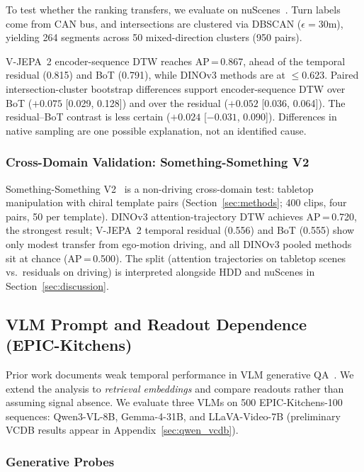 \documentclass{article}
\theoremstyle{remark}
\begin{document}
To test whether the ranking transfers, we evaluate on nuScenes~\cite{nuscenes}. Turn labels come from CAN bus, and intersections are clustered via DBSCAN ($\epsilon\!=\!30$m), yielding 264 segments across 50 mixed-direction clusters (950 pairs).

V-JEPA~2 encoder-sequence DTW reaches AP\,=\,0.867, ahead of the temporal residual (0.815) and BoT (0.791), while DINOv3 methods are at $\leq$0.623. Paired intersection-cluster bootstrap differences support encoder-sequence DTW over BoT ($+0.075$ [0.029, 0.128]) and over the residual ($+0.052$ [0.036, 0.064]). The residual--BoT contrast is less certain ($+0.024$ [$-0.031$, 0.090]). Differences in native sampling are one possible explanation, not an identified cause.

\subsubsection{Cross-Domain Validation: Something-Something V2}
\label{sec:ssv2}

Something-Something V2~\cite{ssv2} is a non-driving cross-domain test: tabletop manipulation with chiral template pairs (Section~\ref{sec:methods}; 400 clips, four pairs, 50 per template). DINOv3 attention-trajectory DTW achieves AP\,=\,0.720, the strongest result; V-JEPA~2 temporal residual (0.556) and BoT (0.555) show only modest transfer from ego-motion driving, and all DINOv3 pooled methods sit at chance (AP\,=\,0.500). The split (attention trajectories on tabletop scenes vs.\ residuals on driving) is interpreted alongside HDD and nuScenes in Section~\ref{sec:discussion}.

\subsection{VLM Prompt and Readout Dependence (EPIC-Kitchens)}

Prior work documents weak temporal performance in VLM generative QA~\cite{tomato,temporalbench,tempcompass,infact,videozerobench}. We extend the analysis to \emph{retrieval embeddings} and compare readouts rather than assuming signal absence. We evaluate three VLMs on 500 EPIC-Kitchens-100~\cite{epickitchens} sequences: Qwen3-VL-8B, Gemma-4-31B, and LLaVA-Video-7B (preliminary VCDB results appear in Appendix~\ref{sec:qwen_vcdb}).

\subsubsection{Generative Probes}
\label{sec:vlm_generative}
\end{document}
